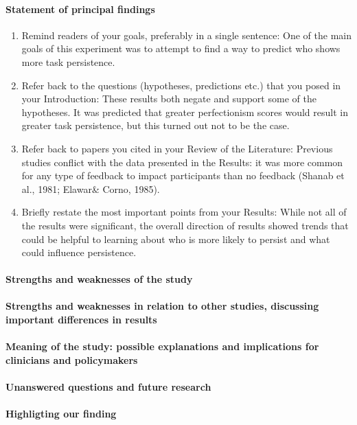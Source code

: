 	\paragraph{Statement of principal findings}
	\begin{enumerate}
		\item
			Remind readers of your goals, preferably in a single sentence:
			One of the main goals of this experiment was to attempt
			 to find a way to predict who shows more task persistence.
		\item
			Refer back to the questions (hypotheses, predictions etc.) 
			that you posed in your Introduction:
				These results both negate and support some of the hypotheses.
				It was predicted that greater perfectionism scores would result
				in greater task persistence, but this turned out not to be
				the case.
		\item
			Refer back to papers you cited in your Review of the Literature:
			Previous studies conflict with the data presented in the Results: 
			it was more common for any type of feedback to impact participants 
			than no feedback (Shanab et al., 1981; Elawar& Corno, 1985).
		\item
			Briefly restate the most important points from your Results:
			While not all of the results were significant, 
			the overall direction of results showed trends 
			that could be helpful to learning about who is more 
			likely to persist and what could influence persistence.
	\end{enumerate}

	\paragraph{Strengths and weaknesses of the study}
	\paragraph{Strengths and weaknesses in relation 
		to other studies, discussing important
		differences in results}
	\paragraph{Meaning of the study: possible explanations 
	and implications for clinicians
	and policymakers}
	\paragraph{Unanswered questions and future research}

\paragraph{Highligting our finding}